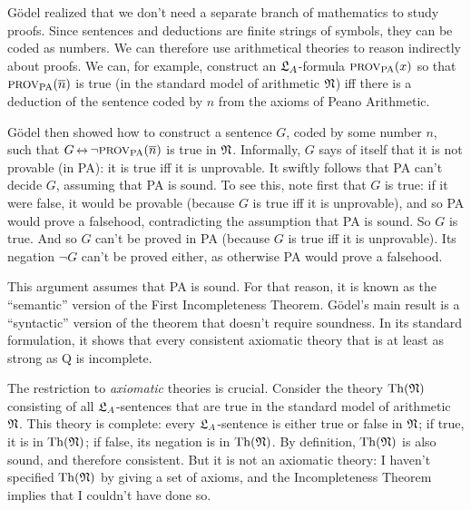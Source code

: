 Gödel realized that
we don't need a separate branch of mathematics to study proofs.
Since sentences and deductions are finite strings of symbols,
they can be coded as numbers.
We can therefore use arithmetical theories to reason indirectly about proofs.
We can,
for example,
construct an $\mathfrak{L}_A$-formula $\smallcaps{Prov}_{\mathrm{PA}}(x)$
so that $\smallcaps{Prov}_{\mathrm{PA}}(\num{n})$ is true (in the standard model of arithmetic $\mathfrak{N}$) iff
there is a deduction of the sentence coded by $n$
from the axioms of Peano Arithmetic.
 
Gödel then showed how to construct a sentence $G$, coded by some number $n$, such that
$G \leftrightarrow \neg \smallcaps{Prov}_{\mathrm{PA}}(\num{n})$ is true in $\mathfrak{N}$.
Informally,
$G$ says of itself that it is not provable (in PA):
it is true iff it is unprovable.
It swiftly follows that
PA can't decide $G$,
assuming that PA is sound.
To see this,
note first that $G$ is true:
if it were false,
it would be provable
(because $G$ is true iff it is unprovable),
and so PA would prove a falsehood,
contradicting the assumption that PA is sound.
So $G$ is true.
And so $G$ can't be proved in PA
(because $G$ is true iff it is unprovable).
Its negation $\neg G$ can't be proved either,
as otherwise PA would prove a falsehood.

This argument assumes that PA is sound.
For that reason,
it is known as the ``semantic'' version of the First Incompleteness Theorem.
Gödel's main result is a ``syntactic'' version of the theorem
that doesn't require soundness.
In its standard formulation,
it shows that
every consistent axiomatic theory that is at least as strong as Q is incomplete.

The restriction to \emph{axiomatic} theories is crucial.
Consider the theory $\mathrm{Th}(\mathfrak{N})$ consisting of
all $\mathfrak{L}_A$-sentences that are true in the standard model of arithmetic $\mathfrak{N}$.
This theory is complete:
every $\mathfrak{L}_A$-sentence is either true or false in $\mathfrak{N}$;
if true, it is in $\mathrm{Th}(\mathfrak{N})$;
if false, its negation is in $\mathrm{Th}(\mathfrak{N})$.
By definition, $\mathrm{Th}(\mathfrak{N})$ is also sound,
and therefore consistent.
But it is not an axiomatic theory:
I haven't specified $\mathrm{Th}(\mathfrak{N})$ by giving a set of axioms,
and the Incompleteness Theorem implies that I couldn't have done so.

